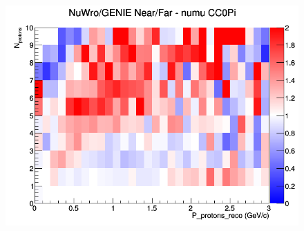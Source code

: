 \begin{figure}[h]
\endminipage
{}
\includegraphics[width=\linewidth]{eff_N_P/GAr/protons/ratios/CC0Pi_NuWro_GENIE_numu_NF_N_P.png}
\endminipage
\newline
\end{figure}
\clearpage
